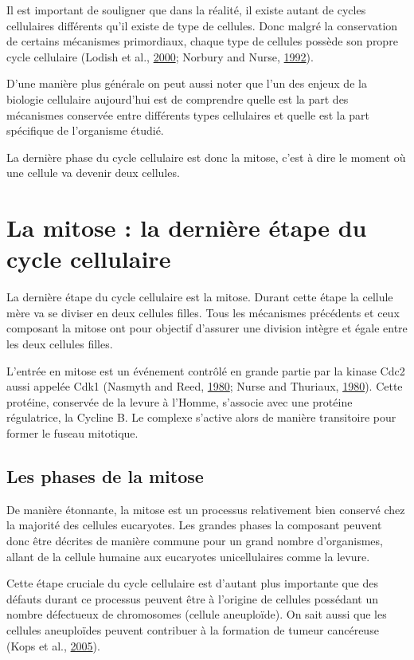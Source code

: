 \documentclass[12pt,a4paper,twoside,openright]{book}
\begin{document}
Il est important de souligner que dans la réalité, il existe autant de
cycles cellulaires différents qu'il existe de type de cellules. Donc
malgré la conservation de certains mécanismes primordiaux, chaque type
de cellules possède son propre cycle cellulaire (Lodish et al.,
\hyperref[ref-Lodish2000]{2000}; Norbury and Nurse,
\hyperref[ref-Norbury1992]{1992}).

D'une manière plus générale on peut aussi noter que l'un des enjeux de
la biologie cellulaire aujourd'hui est de comprendre quelle est la part
des mécanismes conservée entre différents types cellulaires et quelle
est la part spécifique de l'organisme étudié.

La dernière phase du cycle cellulaire est donc la mitose, c'est à dire
le moment où une cellule va devenir deux cellules.

\section{La mitose : la dernière étape du cycle
cellulaire}\label{la-mitose-la-derniuxe8re-uxe9tape-du-cycle-cellulaire}

La dernière étape du cycle cellulaire est la mitose. Durant cette étape
la cellule mère va se diviser en deux cellules filles. Tous les
mécanismes précédents et ceux composant la mitose ont pour objectif
d'assurer une division intègre et égale entre les deux cellules filles.

L'entrée en mitose est un événement contrôlé en grande partie par la
kinase Cdc2 aussi appelée Cdk1 (Nasmyth and Reed,
\hyperref[ref-Nasmyth1980]{1980}; Nurse and Thuriaux,
\hyperref[ref-Nurse1980]{1980}). Cette protéine, conservée de la levure
à l'Homme, s'associe avec une protéine régulatrice, la Cycline B. Le
complexe s'active alors de manière transitoire pour former le fuseau
mitotique.

\subsection{Les phases de la mitose}\label{les-phases-de-la-mitose}

De manière étonnante, la mitose est un processus relativement bien
conservé chez la majorité des cellules eucaryotes. Les grandes phases la
composant peuvent donc être décrites de manière commune pour un grand
nombre d'organismes, allant de la cellule humaine aux eucaryotes
unicellulaires comme la levure.

Cette étape cruciale du cycle cellulaire est d'autant plus importante
que des défauts durant ce processus peuvent être à l'origine de cellules
possédant un nombre défectueux de chromosomes (cellule aneuploïde). On
sait aussi que les cellules aneuploïdes peuvent contribuer à la
formation de tumeur cancéreuse (Kops et al.,
\hyperref[ref-Kops2005]{2005}).
\end{document}
